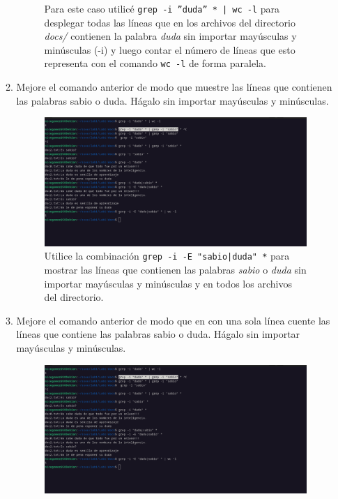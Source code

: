 \documentclass{templateNote}
\begin{document}
\begin{enumerate}
\begin{enumerate}[label=\alph*)]
\begin{figure}[H]
            Para este caso utilicé \texttt{grep -i ''duda'' * | wc -l} para desplegar todas las líneas que en los archivos del directorio \textit{docs/} contienen la palabra \textit{duda} sin importar mayúsculas y minúsculas (-i) y luego contar el número de líneas que esto representa con el comando \texttt{wc -l} de forma paralela.
        \end{figure}
        \item Mejore el comando anterior de modo que muestre las líneas que contienen las palabras sabio o duda. Hágalo sin importar mayúsculas y minúsculas.
        \begin{figure}[H]
            \centering
            \includegraphics[width=\textwidth]{img/ejerc9b.png}
            Utilice la combinación \texttt{grep -i -E "sabio|duda" *} para mostrar las líneas que contienen las palabras \textit{sabio} o \textit{duda} sin importar mayúsculas y minúsculas y en todos los archivos del directorio.
        \end{figure}
        \item Mejore el comando anterior de modo que en con una sola línea cuente las líneas que contiene las palabras sabio o duda. Hágalo sin importar mayúsculas y minúsculas.
        \begin{figure}[H]
            \centering
            \includegraphics[width=\textwidth]{img/ejerc9b.png}

\end{figure}
\end{enumerate}
\end{enumerate}
\end{document}
